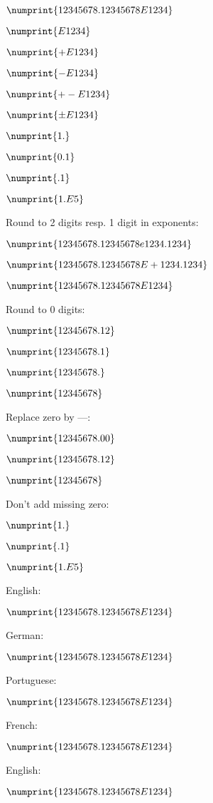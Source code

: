 \documentclass[portuges,french,ngerman,english,a4paper,fleqn,11pt]{article}
\begin{document}
$\numprint{12345678.12345678E1234}$

$\numprint{E1234}$

$\numprint{+E1234}$

$\numprint{-E1234}$

$\numprint{+-E1234}$

$\numprint{\pm E1234}$

$\numprint{1.}$

$\numprint{0.1}$

$\numprint{.1}$

$\numprint{1.E5}$

Round to 2 digits resp. 1 digit in exponents:

{%
$\numprint{12345678.12345678e1234.1234}$

$\numprint{12345678.12345678E+1234.1234}$

$\numprint{12345678.12345678E1234}$}

Round to 0 digits:

{%
$\numprint{12345678.12}$

$\numprint{12345678.1}$

$\numprint{12345678.}$

$\numprint{12345678}$}

Replace zero by ---:

{\npreplacenull{\mbox{---}}%
$\numprint{12345678.00}$

$\numprint{12345678.12}$

$\numprint{12345678}$}

Don't add missing zero:

{\npnoaddmissingzero
$\numprint{1.}$

$\numprint{.1}$

$\numprint{1.E5}$}

English:

$\numprint{12345678.12345678E1234}$

{German:

$\numprint{12345678.12345678E1234}$}

{Portuguese:

$\numprint{12345678.12345678E1234}$}

{French:

$\numprint{12345678.12345678E1234}$}

English:

$\numprint{12345678.12345678E1234}$
\end{document}
